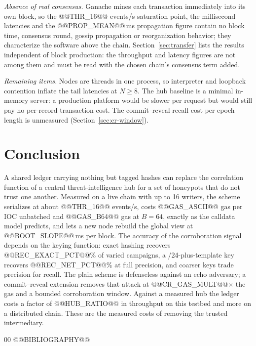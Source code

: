 \documentclass[conference]{IEEEtran}
\begin{document}
\emph{Absence of real consensus.} Ganache mines each transaction immediately into its own block, so the @@THR_16@@ events/s saturation point, the millisecond latencies and the @@PROP_MEAN@@\,ms propagation figure contain no block time, consensus round, gossip propagation or reorganization behavior; they characterize the software above the chain. Section~\ref{sec:transfer} lists the results independent of block production: the throughput and latency figures are not among them and must be read with the chosen chain's consensus term added.

\emph{Remaining items.} Nodes are threads in one process, so interpreter and loopback contention inflate the tail latencies at $N\ge 8$. The hub baseline is a minimal in-memory server: a production platform would be slower per request but would still pay no per-record transaction cost. The commit--reveal recall cost per epoch length is unmeasured (Section~\ref{sec:cr-window}).

\section{Conclusion}
A shared ledger carrying nothing but tagged hashes can replace the correlation function of a central threat-intelligence hub for a set of honeypots that do not trust one another. Measured on a live chain with up to 16 writers, the scheme serializes at about @@THR_16@@ events/s, costs @@GAS_ASCII@@ gas per IOC unbatched and @@GAS_B64@@ gas at $B=64$, exactly as the calldata model predicts, and lets a new node rebuild the global view at @@BOOT_SLOPE@@\,ms per block. The accuracy of the corroboration signal depends on the keying function: exact hashing recovers @@REC_EXACT_PCT@@\% of varied campaigns, a /24-plus-template key recovers @@REC_NET_PCT@@\% at full precision, and coarser keys trade precision for recall. The plain scheme is defenseless against an echo adversary; a commit--reveal extension removes that attack at @@CR_GAS_MULT@@$\times$ the gas and a bounded corroboration window. Against a measured hub the ledger costs a factor of @@HUB_RATIO@@ in throughput on this testbed and more on a distributed chain. These are the measured costs of removing the trusted intermediary.

{\footnotesize
\begin{thebibliography}{00}
\setlength{\itemsep}{0pt plus 0.3pt}
@@BIBLIOGRAPHY@@
\end{thebibliography}}
\end{document}
